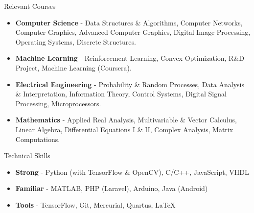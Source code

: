 \documentclass{resume} %
\begin{document}
\begin{rSection}{Relevant Courses}
\begin{itemize}[leftmargin=*]
\itemsep -0.5em 
\item \textbf{Computer Science} - Data Structures \& Algorithms, Computer Networks, Computer Graphics, Advanced Computer Graphics, Digital Image Processing\footnotemark[3], Operating Systems\footnotemark[3], Discrete Structures\footnotemark[4].
\item \textbf{Machine Learning} - Reinforcement Learning\footnotemark[3], Convex Optimization\footnotemark[4],  R\&D Project, Machine Learning (Coursera).
\item \textbf{Electrical Engineering} - Probability \& Random Processes, Data Analysis \& Interpretation, Information Theory\footnotemark[4], Control Systems, Digital Signal Processing, Microprocessors.
\item \textbf{Mathematics} - Applied Real Analysis\footnotemark[3], Multivariable \& Vector Calculus, Linear Algebra, Differential Equations I \& II, Complex Analysis, Matrix Computations.
\end{itemize}
\end{rSection}
\vspace*{-1mm}
\begin{rSection}{Technical Skills}
\begin{itemize}[leftmargin=*]
\itemsep -0.5em 
\item \textbf{Strong} - Python (with TensorFlow \& OpenCV), C/C++, JavaScript, VHDL
\item \textbf{Familiar} - MATLAB, PHP (Laravel), Arduino, Java (Android)
\item \textbf{Tools} - TensorFlow, Git, Mercurial, Quartus, \LaTeX
\end{itemize}
\end{rSection}
\vspace*{-1mm}
\end{document}
